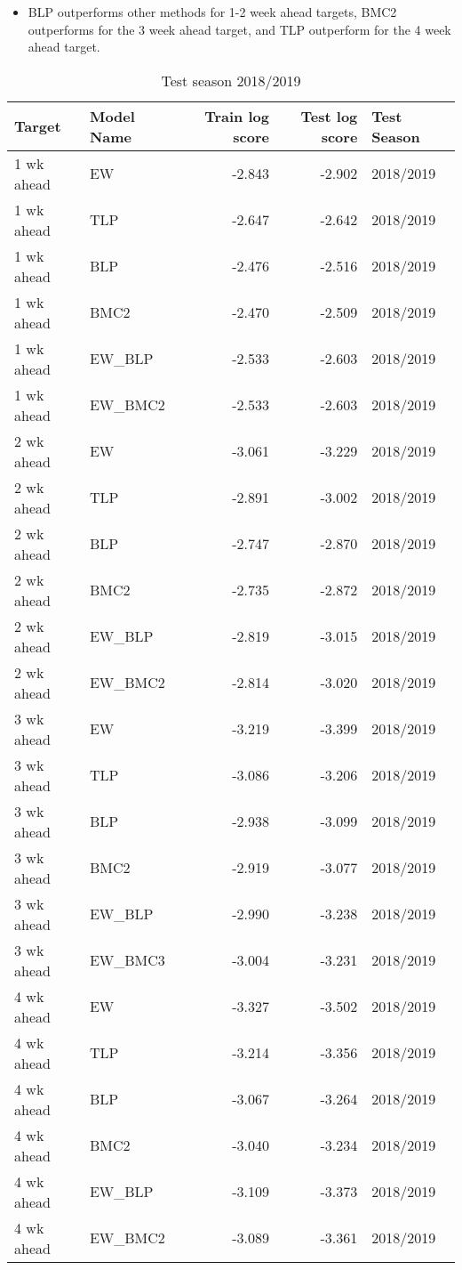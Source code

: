 \documentclass[
]{article}
\begin{document}
\begin{itemize}
\item BLP outperforms other methods for 1-2 week ahead targets, BMC2 outperforms for the 3 week ahead target, and TLP outperform for the 4 week ahead target.
\end{itemize}

\newpage

\begin{table}[H]

\caption{\label{tab:unnamed-chunk-8}Test season 2018/2019}
\centering
\begin{tabular}[t]{llrrl}
\toprule
Target & Model Name & Train log score & Test log score & Test Season\\
\midrule
1 wk ahead & EW & -2.843 & -2.902 & 2018/2019\\
1 wk ahead & TLP & -2.647 & -2.642 & 2018/2019\\
1 wk ahead & BLP & -2.476 & -2.516 & 2018/2019\\
1 wk ahead & BMC2 & -2.470 & -2.509 & 2018/2019\\
1 wk ahead & EW\_BLP & -2.533 & -2.603 & 2018/2019\\
1 wk ahead & EW\_BMC2 & -2.533 & -2.603 & 2018/2019\\
2 wk ahead & EW & -3.061 & -3.229 & 2018/2019\\
2 wk ahead & TLP & -2.891 & -3.002 & 2018/2019\\
2 wk ahead & BLP & -2.747 & -2.870 & 2018/2019\\
2 wk ahead & BMC2 & -2.735 & -2.872 & 2018/2019\\
2 wk ahead & EW\_BLP & -2.819 & -3.015 & 2018/2019\\
2 wk ahead & EW\_BMC2 & -2.814 & -3.020 & 2018/2019\\
3 wk ahead & EW & -3.219 & -3.399 & 2018/2019\\
3 wk ahead & TLP & -3.086 & -3.206 & 2018/2019\\
3 wk ahead & BLP & -2.938 & -3.099 & 2018/2019\\
3 wk ahead & BMC2 & -2.919 & -3.077 & 2018/2019\\
3 wk ahead & EW\_BLP & -2.990 & -3.238 & 2018/2019\\
3 wk ahead & EW\_BMC3 & -3.004 & -3.231 & 2018/2019\\
4 wk ahead & EW & -3.327 & -3.502 & 2018/2019\\
4 wk ahead & TLP & -3.214 & -3.356 & 2018/2019\\
4 wk ahead & BLP & -3.067 & -3.264 & 2018/2019\\
4 wk ahead & BMC2 & -3.040 & -3.234 & 2018/2019\\
4 wk ahead & EW\_BLP & -3.109 & -3.373 & 2018/2019\\
4 wk ahead & EW\_BMC2 & -3.089 & -3.361 & 2018/2019\\
\bottomrule
\end{tabular}
\end{table}
\end{document}
